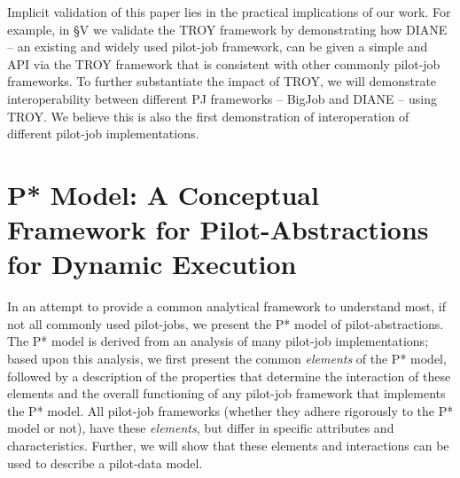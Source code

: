 \documentclass[conference,final]{IEEEtran}
\newcommand{\jhanote}[1]{ {\textcolor{red} { ***shantenu: #1 }}}
\newcommand{\alnote}[1]{ {\textcolor{blue} { ***andre: #1 }}}
\newcommand{\alnote}[1]{}
\newcommand{\jhanote}[1]{}
\newcommand{\upp}{\vspace*{-0.5em}}
\begin{document}




Implicit validation of this paper lies in the practical implications
of our work. For example, in \S{V} we validate the TROY framework by
demonstrating how DIANE~\cite{Moscicki:908910} -- an existing and
widely used pilot-job framework, can be given a simple and API via the
TROY framework that is consistent with other commonly pilot-job
frameworks. To further substantiate the impact of TROY, we will
demonstrate interoperability between different PJ frameworks -- BigJob
and DIANE -- using TROY. We believe this is also the first
demonstration of interoperation of different pilot-job
implementations.





\section{P* Model: A Conceptual Framework for Pilot-Abstractions for
  Dynamic Execution \upp\upp}
\label{sec:pilot-model}

In an attempt to provide a common analytical framework to understand
most, if not all commonly used pilot-jobs, we present the P* model of
pilot-abstractions. The P* model is derived from an analysis of many
pilot-job implementations; based upon this analysis, we first present
the common {\it elements} of the P* model, followed by a description
of the properties %
that determine the interaction of these elements and the overall
functioning of any pilot-job framework that implements the P*
model. All pilot-job frameworks (whether they adhere rigorously to the
P* model or not), have these {\it elements}, but differ in specific
attributes and characteristics.  Further, we will show that these
elements and interactions can be used to describe a pilot-data model.
 
\end{document}
